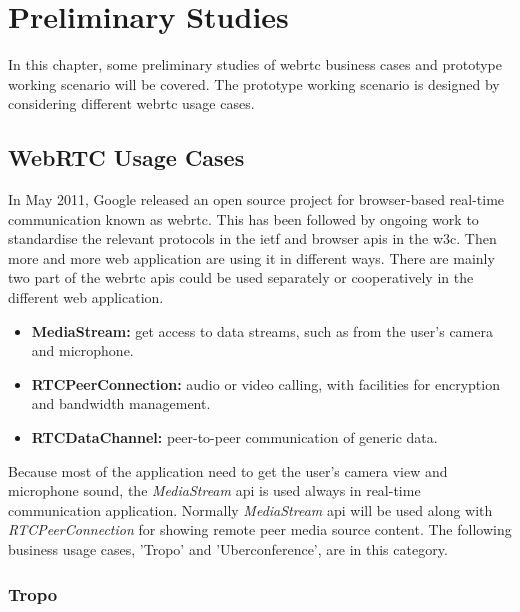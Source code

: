 \chapter{Preliminary Studies}
\label{chp:pre_study}

\noindent In this chapter, some preliminary studies of \gls{webrtc} business cases and prototype working scenario will be covered. The prototype working scenario is designed by considering different \gls{webrtc} usage cases.

\section{WebRTC Usage Cases}

\noindent In May 2011, Google released an open source project for browser-based real-time communication known as \gls{webrtc}. This has been followed by ongoing work to standardise the relevant protocols in the \gls{ietf} and browser \gls{api}s in the \gls{w3c}. Then more and more web application are using it in different ways. There are mainly two part of the \gls{webrtc} \gls{api}s could be used separately or cooperatively in the different web application.

\begin{itemize}[topsep=-1em,parsep=0em,itemsep=0em]
 \item \textbf{MediaStream:} get access to data streams, such as from the user's camera and microphone.
 \item \textbf{RTCPeerConnection:} audio or video calling, with facilities for encryption and bandwidth management.
 \item \textbf{RTCDataChannel:} peer-to-peer communication of generic data.
\end{itemize}

\par Because most of the application need to get the user's camera view and microphone sound, the \textit{MediaStream} \gls{api} is used always in real-time communication application. Normally \textit{MediaStream} \gls{api} will be used along with \textit{RTCPeerConnection} for showing remote peer media source content. The following business usage cases, 'Tropo' and 'Uberconference', are in this category.

\subsection{Tropo}

